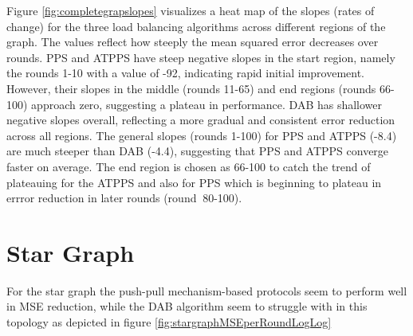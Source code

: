 
Figure \ref{fig:completegrapslopes} visualizes a heat map of the slopes (rates of change) for the three load balancing algorithms across different regions of the graph. The values reflect how steeply the mean squared error decreases over rounds. PPS and ATPPS have steep negative slopes in the start region, namely the rounds 1-10 with a value of -92, indicating rapid initial improvement. However, their slopes in the middle (rounds 11-65) and end regions (rounds 66-100) approach zero, suggesting a plateau in performance. DAB has shallower negative slopes overall, reflecting a more gradual and consistent error reduction across all regions. The general slopes (rounds 1-100) for PPS and ATPPS (-8.4) are much steeper than DAB (-4.4), suggesting that PPS and ATPPS converge faster on average. The end region is chosen as 66-100 to catch the trend of plateauing for the ATPPS and also for PPS which is beginning to plateau in errror reduction in later rounds (round $~$80-100).



\section{Star Graph}\label{sec:stargraph}
For the star graph the push-pull mechanism-based protocols seem to perform well in MSE reduction, while the DAB algorithm seem to struggle with in this topology as depicted in figure \ref{fig:stargraphMSEperRoundLogLog}


